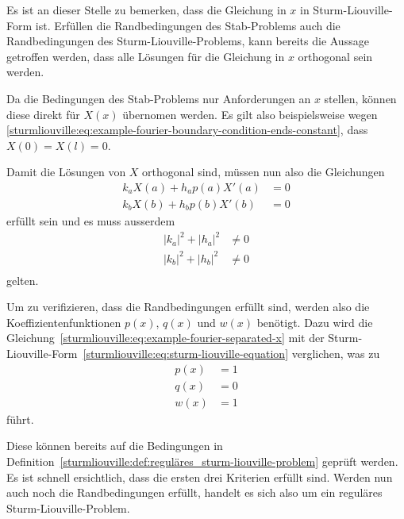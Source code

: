 %
%

Es ist an dieser Stelle zu bemerken, dass die Gleichung in $x$ in 
Sturm-Liouville-Form ist.
Erfüllen die Randbedingungen des Stab-Problems auch die Randbedingungen des
Sturm-Liouville-Problems, kann bereits die Aussage getroffen werden, dass alle
Lösungen für die Gleichung in $x$ orthogonal sein werden.

Da die Bedingungen des Stab-Problems nur Anforderungen an $x$ stellen, können
diese direkt für $X(x)$ übernomen werden.
Es gilt also beispielsweise wegen
\eqref{sturmliouville:eq:example-fourier-boundary-condition-ends-constant},
dass $X(0) = X(l) = 0$.

Damit die Lösungen von $X$ orthogonal sind, müssen nun also die Gleichungen
\begin{equation}
\begin{aligned}
	\label{sturmliouville:eq:example-fourier-randbedingungen}
	k_a X(a) + h_a p(a) X'(a) &= 0 \\
	k_b X(b) + h_b p(b) X'(b) &= 0
\end{aligned}
\end{equation}
erfüllt sein und es muss ausserdem
\begin{equation}
\begin{aligned}
    \label{sturmliouville:eq:example-fourier-coefficient-constraints}
    |k_a|^2 + |h_a|^2 &\neq 0\\
    |k_b|^2 + |h_b|^2 &\neq 0\\
\end{aligned}
\end{equation}
gelten.

Um zu verifizieren, dass die Randbedingungen erfüllt sind, werden also die
Koeffizientenfunktionen $p(x)$, $q(x)$ und $w(x)$ benötigt.
Dazu wird die Gleichung~\eqref{sturmliouville:eq:example-fourier-separated-x}
mit der
Sturm-Liouville-Form~\eqref{sturmliouville:eq:sturm-liouville-equation}
verglichen, was zu 
\[
\begin{aligned} 
    p(x) &= 1 \\
    q(x) &= 0 \\
    w(x) &= 1
\end{aligned}
\]
führt.

Diese können bereits auf die Bedingungen in
Definition~\ref{sturmliouville:def:reguläres_sturm-liouville-problem} geprüft
werden.
Es ist schnell ersichtlich, dass die ersten drei Kriterien erfüllt sind.
Werden nun auch noch die Randbedingungen erfüllt, handelt es sich also um ein
reguläres Sturm-Liouville-Problem.

